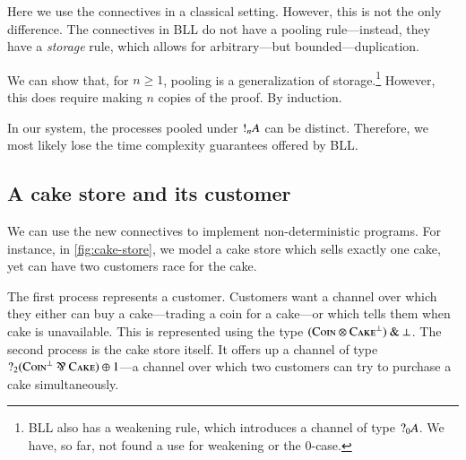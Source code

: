 \documentclass[twocolumn]{article}
\begin{document}
Here we use the connectives in a classical setting.
However, this is not the only difference.
The connectives in BLL do not have a pooling rule---instead, they have a
\emph{storage} rule, which allows for arbitrary---but bounded---duplication.
\begin{center}
  \begin{proofbox}
  \end{proofbox}
\end{center}
We can show that, for $n \geq 1$, pooling is a generalization of
storage.\footnote{%
  BLL also has a weakening rule, which introduces a channel of type
  $\give[0]{A}$. We have, so far, not found a use for weakening or the $0$-case.
}
However, this does require making $n$ copies of the proof.
By induction.
\begin{proofblock}
  \noLine
  \UIC{$\vphantom{!}\smash[t]{\vdots}$}
  \noLine
  \noLine
  \UIC{$\vphantom{!}\smash[t]{\vdots}$}
  \noLine
\end{proofblock}
In our system, the processes pooled under $\take[n]{A}$ can be distinct.
Therefore, we most likely lose the time complexity guarantees offered by BLL.

\subsection{A cake store and its customer}
We can use the new connectives to implement non-deterministic programs.
For instance, in \autoref{fig:cake-store}, we model a cake store which sells
exactly one cake, yet can have two customers race for the cake.

The first process represents a customer. Customers want a channel over which
they either can buy a cake---trading a coin for a cake---or which tells them
when cake is unavailable. This is represented using the type
$(\coin\mult\cake^\bot)\with\bot$.
The second process is the cake store itself. It offers up a channel of type
$\give[2]{(\coin^\bot\parr\cake)\plus{1}}$---a channel over which two customers
can try to purchase a cake simultaneously.
\end{document}
